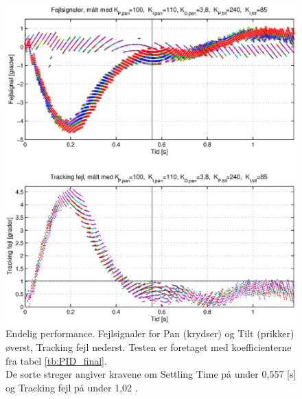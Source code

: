 \begin{figure}[h!]
\centering
\includegraphics[width=1\textwidth]{./graphics/pidPhys2.eps}
\caption[Endelig performance]{Endelig performance. Fejlsignaler for Pan (krydser) og Tilt (prikker) øverst, Tracking fejl nederst.
Testen er foretaget med koefficienterne fra tabel \ref{tb:PID_final}.\\
De sorte streger angiver kravene om Settling Time på under 0,557 [s] og Tracking fejl på under 1,02 \degree{}.} 
\label{fig:PID_final}
\end{figure}
%
%

